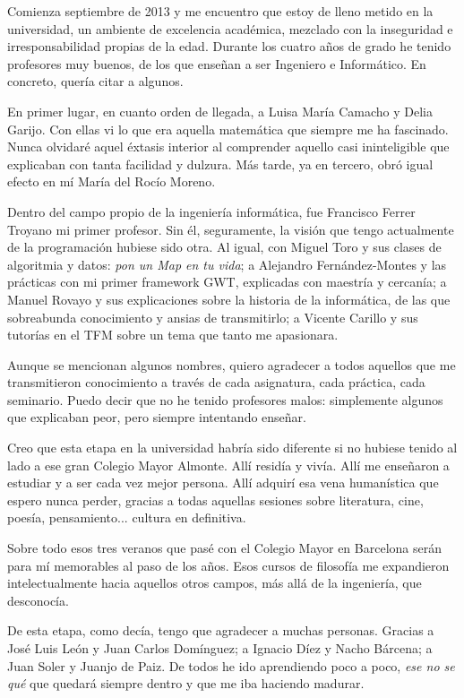 Comienza septiembre de 2013 y me encuentro que estoy de lleno metido en la universidad, un ambiente de excelencia académica, mezclado con la inseguridad e irresponsabilidad propias de la edad. Durante los cuatro años de grado he tenido profesores muy buenos, de los que enseñan a ser Ingeniero e Informático. En concreto, quería citar a algunos.

En primer lugar, en cuanto orden de llegada, a Luisa María Camacho y Delia Garijo. Con ellas vi lo que era aquella matemática que siempre me ha fascinado. Nunca olvidaré aquel éxtasis interior al comprender aquello casi ininteligible que explicaban con tanta facilidad y dulzura. Más tarde, ya en tercero, obró igual efecto en mí María del Rocío Moreno.

Dentro del campo propio de la ingeniería informática, fue Francisco Ferrer Troyano mi primer profesor. Sin él, seguramente, la visión que tengo actualmente de la programación hubiese sido otra. Al igual, con Miguel Toro y sus clases de algoritmia y datos: \textit{pon un Map en tu vida}; a Alejandro Fernández-Montes y las prácticas con mi primer framework GWT, explicadas con maestría y cercanía; a Manuel Rovayo y sus explicaciones sobre la historia de la informática, de las que sobreabunda conocimiento y ansias de transmitirlo; a Vicente Carillo y sus tutorías en el TFM sobre un tema que tanto me apasionara.

Aunque se mencionan algunos nombres, quiero agradecer a todos aquellos que me transmitieron conocimiento a través de cada asignatura, cada práctica, cada seminario. Puedo decir que no he tenido profesores malos: simplemente algunos que explicaban peor, pero siempre intentando enseñar.

Creo que esta etapa en la universidad habría sido diferente si no hubiese tenido al lado a ese gran Colegio Mayor Almonte. Allí residía y vivía. Allí me enseñaron a estudiar y a ser cada vez mejor persona. Allí adquirí esa vena humanística que espero nunca perder, gracias a todas aquellas sesiones sobre literatura, cine, poesía, pensamiento... cultura en definitiva.

Sobre todo esos tres veranos que pasé con el Colegio Mayor en Barcelona serán para mí memorables al paso de los años. Esos cursos de filosofía me expandieron intelectualmente hacia aquellos otros campos, más allá de la ingeniería, que desconocía.

De esta etapa, como decía, tengo que agradecer a muchas personas. Gracias a José Luis León y Juan Carlos Domínguez; a Ignacio Díez y Nacho Bárcena; a Juan Soler y Juanjo de Paiz. De todos he ido aprendiendo poco a poco, \textit{ese no se qué} que quedará siempre dentro y que me iba haciendo madurar.


